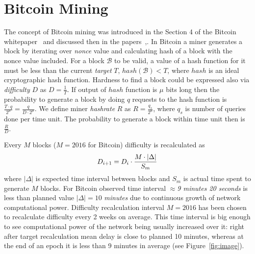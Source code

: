 \documentclass[]{llncs}
\newcommand{\texp}{|\Delta|}
\newcommand{\block}{\mathcal{B}}
\begin{document}
\section{Bitcoin Mining}
\label{sec:bit}

The concept of Bitcoin mining was introduced in the Section 4 of the Bitcoin whitepaper~\cite{Nakamoto2008} and discussed then in the papers~\cite{kraft2015difficulty},\cite{gkl16}. In Bitcoin a miner generates a block by iterating over {\em nonce} value and calculating hash of a block with the nonce value included. For a block $\block$ to be valid, a value of a hash function for it must be less than the current {\em target} $T$, $hash(\block) < T$, where $hash$ is an ideal cryptographic hash function. Hardness to find a block could be expressed also via {\em difficulty} $D$ as $D = \frac{1}{T}$. If output of $hash$ function is $\mu$ bits long then the probability to generate a block by doing $q$ requests to the hash function is $\frac{T \cdot q}{2^\mu} = \frac{q}{D \cdot 2^\mu}$. We define miner \textit{hashrate} $R$ as $R = \frac{q_s}{2^\mu}$, where $q_s$ is number of queries done per time unit. The probability to generate a block within time unit then is $\frac{R}{D}$.


Every $M$ blocks ($M = 2016$ for Bitcoin) difficulty is recalculated as
\begin{equation}
D_{i+1}=D_i \cdot {M \cdot \texp \over S_m}
\end{equation}
where $\texp$ is expected time interval between blocks and $S_m$ is actual time spent to generate $M$ blocks.
For Bitcoin observed time interval $\approx${\em 9 minutes 20 seconds} is less than planned value $\texp = 10$ {\em minutes} due to continuous growth of network computational power.
Difficulty recalculation interval $M=2016$ has been chosen to recalculate difficulty every 2 weeks on average.
This time interval is big enough to see computational power of the network being usually increased over it: right after target recalculation mean delay is close to planned 10 minutes, whereas at the end of an epoch it is less than 9 minutes in average (see Figure~\ref{fig:image}).
\end{document}
